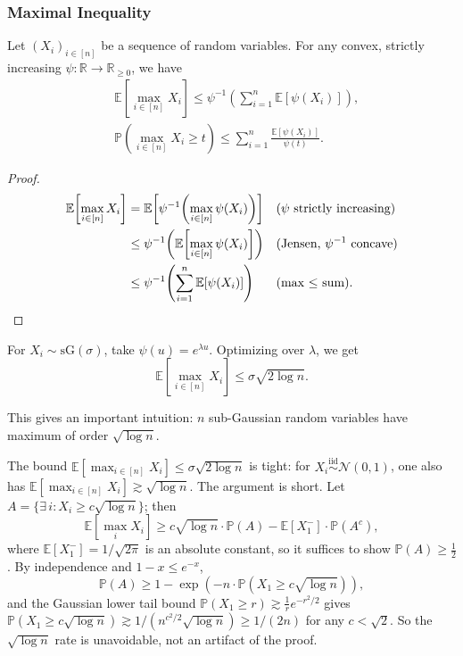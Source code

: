 \subsubsection{Maximal Inequality}
\begin{lem}
Let $(X_i)_{i \in [n]}$ be a sequence of random variables. For any convex, strictly increasing $\psi : \mathbb{R} \to \mathbb{R}_{\geq 0}$, we have
\begin{align*}
&\mathbb{E}\!\left[ \max_{i \in [n]} X_i \right] \leq \psi^{-1}\!\left( \sum_{i=1}^n \mathbb{E}[\psi(X_i)] \right), \\
&\mathbb{P}\!\left( \max_{i \in [n]} X_i \geq t \right) \leq \sum_{i=1}^n \frac{\mathbb{E}[\psi(X_i)]}{\psi(t)}.
\end{align*}
\end{lem}

\begin{proof}
\begin{align*}
\mathbb{E}\!\left[ \max_{i \in [n]} X_i \right] 
&= \mathbb{E}\!\left[ \psi^{-1}\!\left( \max_{i \in [n]} \psi(X_i) \right) \right] && \text{($\psi$ strictly increasing)} \\
&\leq \psi^{-1}\!\left( \mathbb{E}\!\left[ \max_{i \in [n]} \psi(X_i) \right] \right) && \text{(Jensen, $\psi^{-1}$ concave)} \\
&\leq \psi^{-1}\!\left( \sum_{i=1}^n \mathbb{E}[\psi(X_i)] \right) && \text{(max $\leq$ sum)}. \qedhere
\end{align*}
\end{proof}

\begin{exam}
For $X_i \sim \mathrm{sG}(\sigma)$, take $\psi(u) = e^{\lambda u}$. Optimizing over $\lambda$, we get
\[
\mathbb{E}\!\left[ \max_{i \in [n]} X_i \right] \leq \sigma \sqrt{2 \log n}.
\]
\end{exam}

This gives an important intuition: $n$ sub-Gaussian random variables have maximum of order $\sqrt{\log n}$.

\begin{rem}
The bound $\mathbb{E}[\max_{i \in [n]} X_i] \leq \sigma \sqrt{2 \log n}$ is tight: for $X_i \overset{\mathrm{iid}}{\sim} \mathcal{N}(0, 1)$, one also has $\mathbb{E}[\max_{i \in [n]} X_i] \gtrsim \sqrt{\log n}$. The argument is short. Let $A = \{\exists \, i : X_i \geq c\sqrt{\log n}\}$; then
\[
\mathbb{E}\!\left[\max_i X_i\right] \geq c\sqrt{\log n} \cdot \mathbb{P}(A) - \mathbb{E}[X_1^-] \cdot \mathbb{P}(A^c),
\]
where $\mathbb{E}[X_1^-] = 1/\sqrt{2\pi}$ is an absolute constant, so it suffices to show $\mathbb{P}(A) \geq \tfrac{1}{2}$. By independence and $1 - x \leq e^{-x}$,
\[
\mathbb{P}(A) \geq 1 - \exp\!\left(-n \cdot \mathbb{P}(X_1 \geq c\sqrt{\log n})\right),
\]
and the Gaussian lower tail bound $\mathbb{P}(X_1 \geq r) \gtrsim \frac{1}{r} e^{-r^2/2}$ gives $\mathbb{P}(X_1 \geq c\sqrt{\log n}) \gtrsim 1/(n^{c^2/2}\sqrt{\log n}) \geq 1/(2n)$ for any $c < \sqrt{2}$. So the $\sqrt{\log n}$ rate is unavoidable, not an artifact of the proof.
\end{rem}

